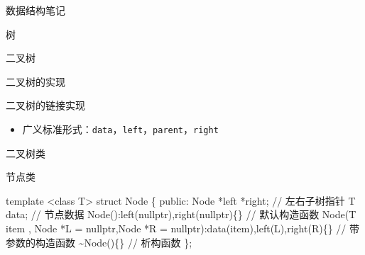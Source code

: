 \documentclass[
  ignorenonframetext,
]{beamer}
\newenvironment{Shaded}{}{}
\newcommand{\NormalTok}[1]{#1}
\providecommand{\tightlist}{%
  \setlength{\itemsep}{0pt}\setlength{\parskip}{0pt}}
\begin{document}
\begin{frame}[fragile]{数据结构笔记}
\begin{block}{树}
\begin{block}{二叉树}
\begin{block}{二叉树的实现}
\begin{block}{二叉树的链接实现}
\begin{itemize}
\tightlist
\item
  广义标准形式：\texttt{data}，\texttt{left}，\texttt{parent}，\texttt{right}
\end{itemize}

\end{block}
\end{block}

\begin{block}{二叉树类}
\protect{}\label{ux4e8cux53c9ux6811ux7c7b}
\begin{block}{节点类}
\protect{}\label{ux8282ux70b9ux7c7b}
\begin{Shaded}
\begin{Highlighting}[]
\NormalTok{template \textless{}class T\textgreater{}}
\NormalTok{struct Node}
\NormalTok{\{}
\NormalTok{  public:}
\NormalTok{    Node *left *right;                                                                // 左右子树指针}
\NormalTok{    T data;                                                                           // 节点数据}
\NormalTok{    Node():left(nullptr),right(nullptr)\{\}                                             // 默认构造函数}
\NormalTok{    Node(T item , Node *L = nullptr,Node *R = nullptr):data(item),left(L),right(R)\{\}  // 带参数的构造函数}
\NormalTok{    \textasciitilde{}Node()\{\}                                                                         // 析构函数}
\NormalTok{\};}
\end{Highlighting}
\end{Shaded}
\end{block}


\end{block}
\end{block}
\end{block}
\end{frame}
\end{document}
